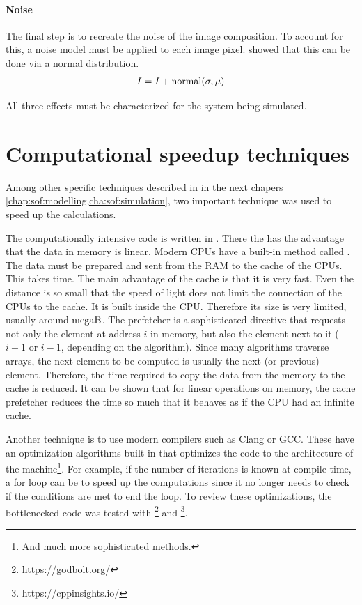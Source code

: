 \paragraph{Noise}
The final step is to recreate the noise of the image composition.
To account for this, a noise model must be applied to each image pixel.
\cite{Wiese:887678} showed that this can be done via a normal distribution.
% 
\begin{align}
    I = I + \operatorname{normal}(\sigma, \mu)
\end{align}
% 
\par
% 
All three effects must be characterized for the system being simulated.
% 
% 
% 
\section{Computational speedup techniques}
% 
Among other specific techniques described in in the next chapers \cref{chap:sof:modelling,cha:sof:simulation}, two important technique was used to speed up the calculations.
\par
% 
The computationally intensive code is written in \cpp{}.
There the  has the advantage that the data in memory is linear.
Modern \acp{CPU} have a built-in method called .
The data must be prepared and sent from the \ac{RAM} to the cache of the \acp{CPU}.
This takes time.
The main advantage of the cache is that it is very fast.
Even the distance is so small that the speed of light does not limit the connection of the \acp{CPU} to the cache.
It is built inside the \ac{CPU}.
Therefore its size is very limited, usually around $\si{mega\byte}$.
The prefetcher is a sophisticated directive that requests not only the element at address $i$ in memory, but also the element next to it ($i+1$ or $i-1$, depending on the algorithm).
Since many algorithms traverse arrays, the next element to be computed is usually the next (or previous) element.
Therefore, the time required to copy the data from the memory to the cache is reduced.
It can be shown that for linear operations on memory, the cache prefetcher reduces the time so much that it behaves as if the \ac{CPU} had an infinite cache.
\par
% 
Another technique is to use modern compilers such as Clang or GCC.
These have an optimization algorithms built in that optimizes the code to the architecture of the machine\footnote{And much more sophisticated methods.}.
For example, if the number of iterations is known at compile time, a for loop can be  to speed up the computations since it no longer needs to check if the conditions are met to end the loop.
To review these optimizations, the bottlenecked code was tested with \footnote{https://godbolt.org/} and \footnote{https://cppinsights.io/}.